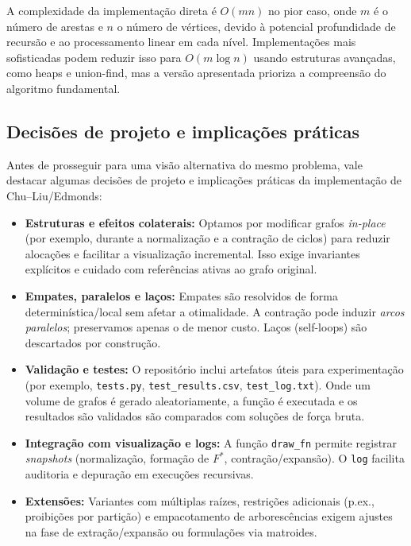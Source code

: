 A complexidade da implementação direta é \(O(mn)\) no pior caso, onde \(m\) é o número de arestas e \(n\) o número de vértices, devido à potencial profundidade de recursão e ao processamento linear em cada nível. Implementações mais sofisticadas podem reduzir isso para \(O(m \log n)\) usando estruturas avançadas, como heaps e union-find, mas a versão apresentada prioriza a compreensão do algoritmo fundamental.

\subsection{Decisões de projeto e implicações práticas}

Antes de prosseguir para uma visão alternativa do mesmo problema, vale destacar algumas decisões de projeto e implicações práticas da implementação de Chu–Liu/Edmonds:
\begin{itemize}\setlength{\itemsep}{2pt}
    \item \textbf{Estruturas e efeitos colaterais:} Optamos por modificar grafos \emph{in-place} (por exemplo, durante a normalização e a contração de ciclos) para reduzir alocações e facilitar a visualização incremental. Isso exige invariantes explícitos e cuidado com referências ativas ao grafo original.
    \item \textbf{Empates, paralelos e laços:} Empates são resolvidos de forma determinística/local sem afetar a otimalidade. A contração pode induzir \emph{arcos paralelos}; preservamos apenas o de menor custo. Laços (self-loops) são descartados por construção.
    \item \textbf{Validação e testes:}  O repositório inclui artefatos úteis para experimentação (por exemplo, \texttt{tests.py}, \texttt{test\_results.csv}, \texttt{test\_log.txt}). Onde um volume de grafos é gerado aleatoriamente, a função é executada e os resultados são validados são comparados com soluções de força bruta.
    \item \textbf{Integração com visualização e logs:} A função \texttt{draw\_fn} permite registrar \emph{snapshots} (normalização, formação de \(F^*\), contração/expansão). O \texttt{log} facilita auditoria e depuração em execuções recursivas.
    \item \textbf{Extensões:} Variantes com múltiplas raízes, restrições adicionais (p.ex., proibições por partição) e empacotamento de arborescências exigem ajustes na fase de extração/expansão ou formulações via matroides.
\end{itemize}

